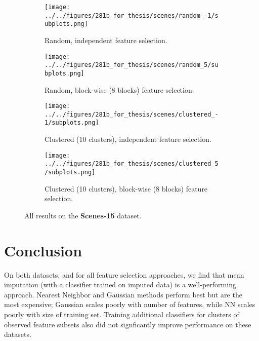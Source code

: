 \begin{figure}[ht]
    \centering
    \begin{subfigure}[b]{.8\textwidth}
        \centering
        \texttt{[image: ../../figures/281b\_for\_thesis/scenes/random\_-1/subplots.png]}
        \caption{Random, independent feature selection.\vspace{.2cm}}
    \end{subfigure}
    \begin{subfigure}[b]{.8\textwidth}
        \centering
        \texttt{[image: ../../figures/281b\_for\_thesis/scenes/random\_5/subplots.png]}
        \caption{Random, block-wise (8 blocks) feature selection.\vspace{.2cm}}
    \end{subfigure}
    \begin{subfigure}[b]{\textwidth}
        \centering
        \texttt{[image: ../../figures/281b\_for\_thesis/scenes/clustered\_-1/subplots.png]}
        \caption{Clustered (10 clusters), independent feature selection.\vspace{.2cm}}
    \end{subfigure}
    \begin{subfigure}[b]{\textwidth}
        \centering
        \texttt{[image: ../../figures/281b\_for\_thesis/scenes/clustered\_5/subplots.png]}
        \caption{Clustered (10 clusters), block-wise (8 blocks) feature selection.\vspace{.2cm}}
    \end{subfigure}
    \caption{All results on the \textbf{Scenes-15} dataset.}
    \label{fig:scenes}
\end{figure}

\section{Conclusion}

On both datasets, and for all feature selection approaches, we find that mean imputation (with a classifier trained on imputed data) is a well-performing approach.
Nearest Neighbor and Gaussian methods perform best but are the most expensive; Gaussian scales poorly with number of features, while NN scales poorly with size of training set.
Training additional classifiers for clusters of observed feature subsets also did not signficantly improve performance on these datasets.
